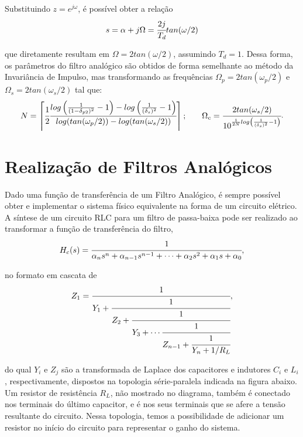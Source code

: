 \documentclass[a4paper,11pt]{article}
\numberwithin{figure}{section}
\numberwithin{equation}{section}
\numberwithin{table}{section}
\theoremstyle{definition}
\begin{document}
Substituindo $z = e^{j\omega}$, é possível obter a relação
\begin{equation}
	s = \alpha + j \Omega = \cfrac{2j}{T_d}tan(\omega / 2)
\end{equation}

\noindent que diretamente resultam em $\Omega = 2 tan(\omega / 2)$, assumindo $T_d = 1$. Dessa forma, os parâmetros do filtro analógico são obtidos de forma semelhante ao método da Invariância de Impulso, mas transformando as frequências $\Omega_p = 2 tan(\omega_p / 2)$ e $\Omega_s = 2 tan(\omega_s / 2)$ tal que:
\begin{equation} \label{eq:bilinear}
\begin{matrix}
	N = \left\lceil \cfrac{1}{2} \cfrac{log \left(\frac{1}{(1-\delta_{p2})^2} - 1 \right) - log \left( \frac{1}{(\delta_{s})^2} - 1 \right)}{log(tan(\omega_p / 2)) - log(tan(\omega_s / 2))} \right\rceil; & & 
	\Omega_c = \cfrac{2 tan(\omega_s / 2)}{10^{\frac{1}{2N} log \left(\frac{1}{(\delta_{s})^2} - 1 \right)}}
\end{matrix}
.\end{equation}

\section{Realização de Filtros Analógicos}

Dado uma função de transferência de um Filtro Analógico, é sempre possível obter e implementar o sistema físico equivalente na forma de um circuito elétrico. A síntese de um circuito RLC para um filtro de passa-baixa pode ser realizado ao transformar a função de transferência do filtro,
\begin{equation}
	H_c(s) = \cfrac{1}{\alpha_n s^n + \alpha_{n-1} s^{n-1} + \cdots + \alpha_2 s^2 + \alpha_1 s + \alpha_0},
\end{equation}

\noindent no formato em cascata de
\begin{equation}
	Z_1 = \cfrac{1}{Y_1 + \cfrac{1}{Z_2 + \cfrac{1}{Y_3 + \cdots \cfrac{1}{Z_{n-1} + \cfrac{1}{Y_n + 1/R_L}}}}},
\end{equation}

\noindent do qual $Y_i$ e $Z_j$ são a transformada de Laplace dos capacitores e indutores $C_i$ e $L_i$, respectivamente, dispostos na topologia série-paralela indicada na figura abaixo. Um resistor de resistência $R_L$, não mostrado no diagrama, também é conectado nos terminais do último capacitor, e é nos seus terminais que se afere a tensão resultante do circuito. Nessa topologia, temos a possibilidade de adicionar um resistor no início do circuito para representar o ganho do sistema.
\end{document}

